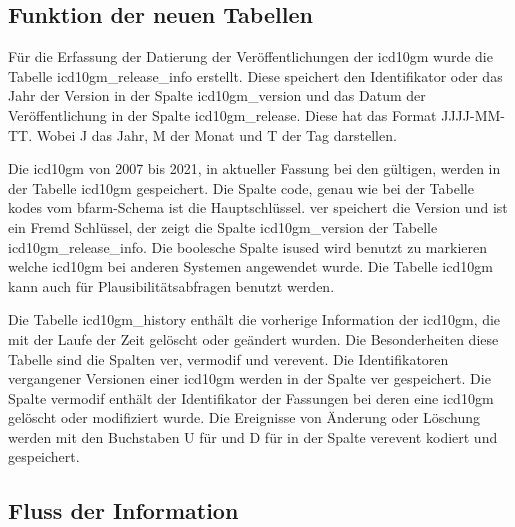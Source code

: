 \subsection{Funktion der neuen Tabellen} \label{newtables}

Für die Erfassung der Datierung der Veröffentlichungen der \ac{icd10gm} wurde die Tabelle {\ttfamily icd10gm\_release\_info} erstellt. Diese speichert den Identifikator oder das Jahr der Version in der Spalte {\ttfamily icd10gm\_version} und das Datum der Veröffentlichung in der Spalte {\ttfamily icd10gm\_release}. Diese hat das Format {\ttfamily JJJJ-MM-TT}. Wobei J das Jahr, M der Monat und T der Tag darstellen.

Die \ac{icd10gm} von 2007 bis 2021, in aktueller Fassung bei den gültigen, werden in der Tabelle {\ttfamily icd10gm} gespeichert. Die Spalte {\ttfamily code}, genau wie bei der Tabelle {\ttfamily kodes} vom \ac{bfarm}-Schema ist die Hauptschlüssel. {\ttfamily ver} speichert die Version und ist ein Fremd Schlüssel, der zeigt die Spalte {\ttfamily icd10gm\_version} der Tabelle {\ttfamily icd10gm\_release\_info}. Die boolesche Spalte {\ttfamily isused} wird benutzt zu markieren welche \ac{icd10gm} bei anderen Systemen angewendet wurde. Die Tabelle {\ttfamily icd10gm} kann auch für Plausibilitätsabfragen benutzt werden.

Die Tabelle {\ttfamily icd10gm\_history} enthält die vorherige Information der \ac{icd10gm}, die mit der Laufe der Zeit gelöscht oder geändert wurden. Die Besonderheiten diese Tabelle sind die Spalten {\ttfamily ver}, {\ttfamily vermodif} und {\ttfamily verevent}. Die Identifikatoren vergangener Versionen einer \ac{icd10gm} werden in der Spalte {\ttfamily ver} gespeichert. Die Spalte {\ttfamily vermodif} enthält der Identifikator der Fassungen bei deren eine \ac{icd10gm} gelöscht oder modifiziert wurde. Die Ereignisse von Änderung oder Löschung werden mit den Buchstaben {\ttfamily U} für \grqq{} und {\ttfamily D} für \grqq{} in der Spalte {\ttfamily verevent} kodiert und gespeichert.

\subsection{Fluss der Information} \label{dbrun}

